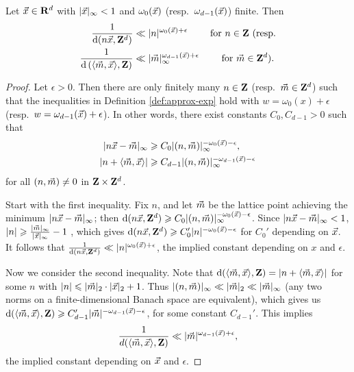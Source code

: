 \begin{lemma}\label{lem:bound-distance}
Let $\vec{x}\in \mathbf{R}^d$ with $|\vec{x}|_\infty< 1$ and $\omega_0(\vec{x})$ 
(resp.~$\omega_{d-1}(\vec{x})$) finite. Then 
\begin{align*}
	\frac{1}{\mathrm{d}(n \vec{x},\mathbf{Z}^d)} 
		&\ll |n|^{\omega_0(\vec{x})+\epsilon}\qquad \text{ for $n\in \mathbf{Z}$ (resp.} \\
	\frac{1}{\mathrm{d}\left(\langle \vec{m},\vec{x}\rangle, \mathbf{Z}\right)} 
		&\ll |\vec{m}|_\infty^{\omega_{d-1}(\vec{x})+\epsilon} \qquad\text{ for $\vec{m}\in \mathbf{Z}^d$).}
\end{align*}
\end{lemma}
\begin{proof}
Let $\epsilon>0$. Then there are only finitely many $n\in \mathbf{Z}$ 
(resp.~$\vec{m}\in \mathbf{Z}^d$) such that the inequalities in Definition 
\ref{def:approx-exp} hold with $w = \omega_0(x)+\epsilon$ 
(resp.~$w = \omega_{d-1}(\vec{x})+\epsilon$). In other words, there exist constants 
$C_0, C_{d-1}>0$ such that 
\begin{align*}
	|n \vec{x} - \vec{m}|_\infty 
		&\geqslant C_0 |(n,\vec{m})|_\infty^{-\omega_0(\vec{x})-\epsilon} ,\\
	|n + \langle \vec{m},\vec{x}\rangle| 
		&\geqslant C_{d-1} |(n,\vec{m})|_\infty^{-\omega_{d-1}(\vec{x})-\epsilon} 
\end{align*}
for all $(n,\vec{m})\ne 0$ in $\mathbf{Z}\times\mathbf{Z}^d$. 

Start with the first inequality. Fix $n$, and let $\vec{m}$ be the lattice point 
achieving the minimum $|n \vec{x} - \vec{m}|_\infty$; then 
$\mathrm{d}(n \vec{x},\mathbf{Z}^d) \geqslant C_0 |(n,\vec{m})|_\infty^{-\omega_0(\vec{x})-\epsilon}$. 
Since $|n\vec{x} - \vec{m}|_\infty < 1$, 
$|n| \geqslant \frac{|\vec{m}|_\infty}{|\vec{x}|_\infty}-1$ , which gives 
$\mathrm{d}(n \vec{x},\mathbf{Z}^d) \geqslant C_0' |n|^{-\omega_0(\vec{x})-\epsilon}$ for $C_0'$ 
depending on $\vec{x}$. It follows that 
$\frac{1}{\mathrm{d}(n \vec{x},\mathbf{Z}^d)} \ll |n|^{\omega_0(\vec{x})+\epsilon}$, the 
implied constant depending on $x$ and $\epsilon$.

Now we consider the second inequality. Note 
that $\mathrm{d}(\langle \vec{m},\vec{x}\rangle,\mathbf{Z}) = |n + \langle \vec{m},\vec{x}\rangle|$ for 
some $n$ with $|n| \leqslant |\vec{m}|_2\cdot |\vec{x}|_2 + 1$. Thus 
$|(n,\vec{m})|_\infty \ll |\vec{m}|_2 \ll |\vec{m}|_\infty$ (any two norms on a 
finite-dimensional Banach space are equivalent), which gives us 
$\mathrm{d}(\langle\vec{m},\vec{x}\rangle,\mathbf{Z}) \geqslant C_{d-1}' |\vec{m}|^{-\omega_{d-1}(\vec{x})-\epsilon}$, for some constant $C_{d-1}'$. This implies 
\[
	\frac{1}{d(\langle \vec{m},\vec{x}\rangle,\mathbf{Z})} \ll |\vec{m}|^{\omega_{d-1}(\vec{x})+\epsilon} ,
\]
the implied constant depending on $\vec{x}$ and $\epsilon$.
\end{proof}





